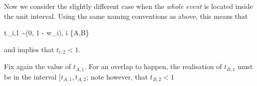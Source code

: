 Now we consider the slightly different case when the \emph{whole event} is located inside the unit interval. Using the same naming conventions as above, this means that

\bee
t_{i,1} \sim \Uc(0, 1 - w_i), \quad i \in \{A,B\}
\eee

and implies that $t_{i,2} < 1$.

Fix again the value of $t_{A,1}$. For an overlap to happen, the realisation of $t_{B,1}$ must be in the interval $[t_{A,1}, t_{A,2}$; note however, that $t_{B,2} < 1$ 

